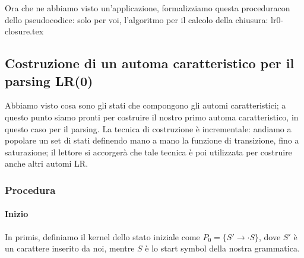 \documentclass[class=book, crop=false, oneside, 12pt]{standalone}
\begin{document}
Ora che ne abbiamo visto un'applicazione, formalizziamo questa proceduracon dello pseudocodice: solo per voi, l'algoritmo per il calcolo della chiusura:
{lr0-closure.tex}

\subsection{Costruzione di un automa caratteristico per il parsing LR(0)}
Abbiamo visto cosa sono gli stati che compongono gli automi caratteristici; a questo punto siamo pronti per costruire il nostro primo automa caratteristico,  in questo caso per il parsing. La tecnica di costruzione è incrementale: andiamo a popolare un set di stati definendo mano a mano la funzione di transizione, fino a saturazione; il lettore si accorgerà che tale tecnica è poi utilizzata per costruire anche altri automi LR.

\subsubsection{Procedura}
\paragraph{Inizio}
In primis, definiamo il kernel dello stato iniziale come \(P_0 = \{S' \to \cdot S\}\), dove \(S'\) è un carattere inserito da noi, mentre \(S\) è lo start symbol della nostra grammatica.
\end{document}
